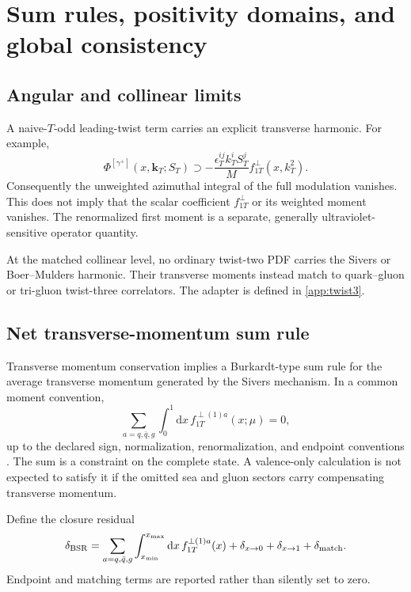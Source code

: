 \documentclass[11pt]{article}
\newcommand{\kT}{\bm{k}_{T}}
\newcommand{\dd}{\mathrm{d}}
\begin{document}
\section{Sum rules, positivity domains, and global consistency}
\label{sec:sum-rules}

\subsection{Angular and collinear limits}

A naive-\(T\)-odd leading-twist term carries an explicit transverse harmonic.
For example,
\begin{equation}
 \Phi^{[\gamma^+]}(x,\kT;S_T)
 \supset
 -\frac{\epsilon_T^{ij}k_T^iS_T^j}{M}
 f_{1T}^{\perp}(x,k_T^2).
\label{eq:sivers-harmonic}
\end{equation}
Consequently the unweighted azimuthal integral of the full modulation
vanishes.  This does not imply that the scalar coefficient
\(f_{1T}^{\perp}\) or its weighted moment vanishes.  The renormalized first
moment is a separate, generally ultraviolet-sensitive operator quantity.

At the matched collinear level, no ordinary twist-two PDF carries the Sivers
or Boer--Mulders harmonic.  Their transverse moments instead match to
quark--gluon or tri-gluon twist-three correlators.  The adapter is defined in
\cref{app:twist3}.

\subsection{Net transverse-momentum sum rule}

Transverse momentum conservation implies a Burkardt-type sum rule for the
average transverse momentum generated by the Sivers mechanism.  In a common
moment convention,
\begin{equation}
 \sum_{a=q,\bar q,g}
 \int_0^1\dd x\,
 f_{1T}^{\perp(1)a}(x;\mu)
 =0,
\label{eq:burkardt-sum-rule}
\end{equation}
up to the declared sign, normalization, renormalization, and endpoint
conventions \cite{Burkardt2004,GoekeMeissnerMetzSchlegel2006}.  The sum is a
constraint on the complete state.  A valence-only calculation is not expected
to satisfy it if the omitted sea and gluon sectors carry compensating
transverse momentum.

Define the closure residual
\begin{equation}
 \delta_{\rm BSR}
 =\sum_{a=q,\bar q,g}
 \int_{x_{\min}}^{x_{\max}}\dd x\,
 f_{1T}^{\perp(1)a}(x)
 +\delta_{x\to0}+\delta_{x\to1}
 +\delta_{\rm match}.
\label{eq:burkardt-residual}
\end{equation}
Endpoint and matching terms are reported rather than silently set to zero.
\end{document}
